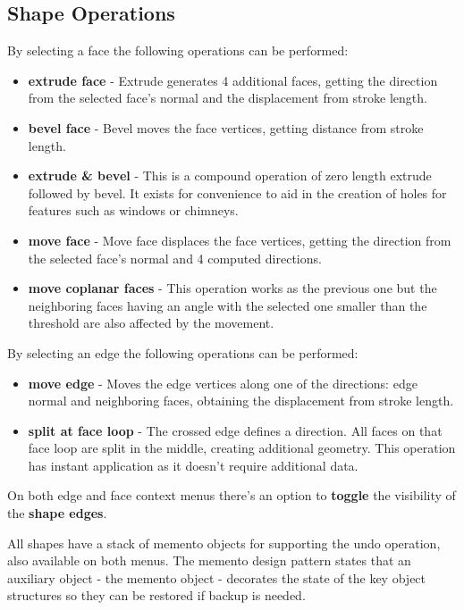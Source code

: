 




\subsection{Shape Operations}


By selecting a face the following operations can be performed:
\begin{itemize}
	\item \textbf{extrude face} - Extrude generates 4 additional faces, getting the direction from the selected face's normal and the displacement from stroke length.
	\item	\textbf{bevel face} - Bevel moves the face vertices, getting distance from stroke length.
	\item	\textbf{extrude \& bevel} - This is a compound operation of zero length extrude followed by bevel. It exists for convenience to aid in the creation of holes for features such as windows or chimneys.
	\item	\textbf{move face} - Move face displaces the face vertices, getting the direction from the selected face's normal and 4 computed directions.
	\item	\textbf{move coplanar faces} - This operation works as the previous one but the neighboring faces having an angle with the selected one smaller than the threshold are also affected by the movement. 
\end{itemize}

By selecting an edge the following operations can be performed:
\begin{itemize}
	\item \textbf{move edge} - Moves the edge vertices along one of the directions: edge normal and neighboring faces, obtaining the displacement from stroke length.
	\item	\textbf{split at face loop} - The crossed edge defines a direction. All faces on that face loop are split in the middle, creating additional geometry. This operation has instant application as it doesn't require additional data.
\end{itemize}

On both edge and face context menus there's an option to \textbf{toggle} the visibility of the \textbf{shape edges}.

All shapes have a stack of memento objects for supporting the undo operation, also available on both menus.
The memento design pattern states that an auxiliary object - the memento object - decorates the state of the key object structures so they
can be restored if backup is needed.


